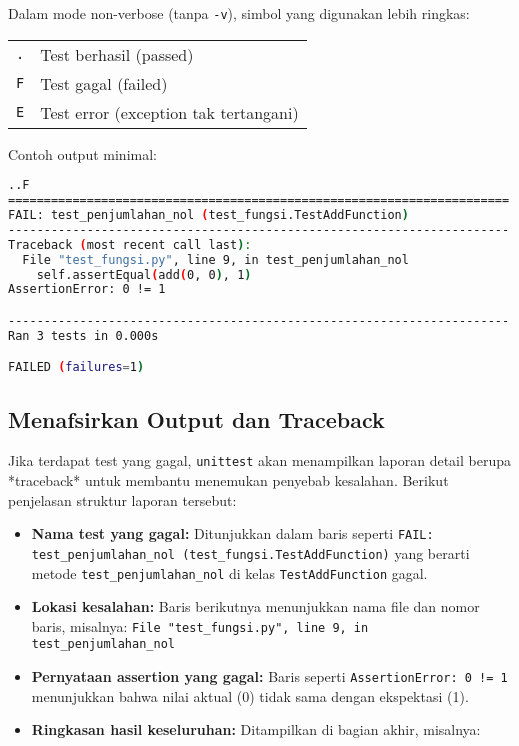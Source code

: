 Dalam mode non-verbose (tanpa \texttt{-v}), simbol yang digunakan lebih ringkas:
\begin{center}
\begin{tabular}{ll}
\texttt{.} & Test berhasil (passed) \\
\texttt{F} & Test gagal (failed) \\
\texttt{E} & Test error (exception tak tertangani) \\
\end{tabular}
\end{center}

\noindent
Contoh output minimal:
\begin{lstlisting}[language=bash]
..F
======================================================================
FAIL: test_penjumlahan_nol (test_fungsi.TestAddFunction)
----------------------------------------------------------------------
Traceback (most recent call last):
  File "test_fungsi.py", line 9, in test_penjumlahan_nol
    self.assertEqual(add(0, 0), 1)
AssertionError: 0 != 1

----------------------------------------------------------------------
Ran 3 tests in 0.000s

FAILED (failures=1)
\end{lstlisting}

\subsection{Menafsirkan Output dan Traceback}

Jika terdapat test yang gagal, \texttt{unittest} akan menampilkan laporan detail berupa *traceback* untuk membantu menemukan penyebab kesalahan.  
Berikut penjelasan struktur laporan tersebut:

\begin{itemize}
    \item \textbf{Nama test yang gagal:}  
    Ditunjukkan dalam baris seperti  
    \texttt{FAIL: test\_penjumlahan\_nol (test\_fungsi.TestAddFunction)}  
    yang berarti metode \texttt{test\_penjumlahan\_nol} di kelas \texttt{TestAddFunction} gagal.

    \item \textbf{Lokasi kesalahan:}  
    Baris berikutnya menunjukkan nama file dan nomor baris, misalnya:  
    \texttt{File "test\_fungsi.py", line 9, in test\_penjumlahan\_nol}

    \item \textbf{Pernyataan assertion yang gagal:}  
    Baris seperti  
    \texttt{AssertionError: 0 != 1}  
    menunjukkan bahwa nilai aktual (0) tidak sama dengan ekspektasi (1).

    \item \textbf{Ringkasan hasil keseluruhan:}  
    Ditampilkan di bagian akhir, misalnya:
\end{itemize}

